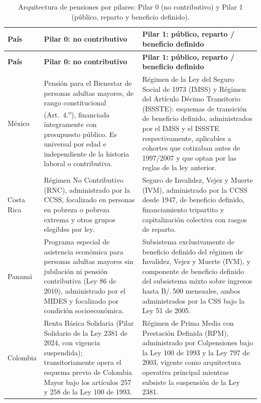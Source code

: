 \documentclass[12pt, letterpaper]{article}
\begin{document}
\begin{xltabular}{\textwidth}{P{2.1cm}Y Y}
\caption{Arquitectura de pensiones por pilares: Pilar 0 (no contributivo) y Pilar 1 (público, reparto y beneficio definido).}
\label{tab:pilares_01}\\
\toprule
\textbf{País} & \textbf{Pilar 0: no contributivo} & \textbf{Pilar 1: público, reparto / beneficio definido} \\
\midrule
\endfirsthead

\toprule
\textbf{País} & \textbf{Pilar 0: no contributivo} & \textbf{Pilar 1: público, reparto / beneficio definido} \\
\midrule
\endhead

\bottomrule
\endfoot

México &
Pensión para el Bienestar de personas adultas mayores, de rango constitucional (Art.\ 4.\textsuperscript{o}), financiada íntegramente con presupuesto público. Es universal por edad e independiente de la historia laboral o contributiva. &
Régimen de la Ley del Seguro Social de 1973 (IMSS) y Régimen del Artículo Décimo Transitorio (ISSSTE): esquemas de transición de beneficio definido, administrados por el IMSS y el ISSSTE respectivamente, aplicables a cohortes que cotizaban antes de 1997/2007 y que optan por las reglas de la ley anterior. \\

Costa Rica &
Régimen No Contributivo (RNC), administrado por la CCSS, focalizado en personas en pobreza o pobreza extrema y otros grupos elegibles por ley. &
Seguro de Invalidez, Vejez y Muerte (IVM), administrado por la CCSS desde 1947, de beneficio definido, financiamiento tripartito y capitalización colectiva con rasgos de reparto. \\

Panamá &
Programa especial de asistencia económica para personas adultas mayores sin jubilación ni pensión contributiva (Ley 86 de 2010), administrado por el MIDES y focalizado por condición socioeconómica. &
Subsistema exclusivamente de beneficio definido del régimen de Invalidez, Vejez y Muerte (IVM), y componente de beneficio definido del subsistema mixto sobre ingresos hasta B/.\,500 mensuales, ambos administrados por la CSS bajo la Ley 51 de 2005. \\

Colombia &
Renta Básica Solidaria (Pilar Solidario de la Ley 2381 de 2024, con vigencia suspendida); transitoriamente opera el esquema previo de Colombia Mayor bajo los artículos 257 y 258 de la Ley 100 de 1993. &
Régimen de Prima Media con Prestación Definida (RPM), administrado por Colpensiones bajo la Ley 100 de 1993 y la Ley 797 de 2003, vigente como arquitectura operativa principal mientras subsiste la suspensión de la Ley 2381. \\


\end{xltabular}
\end{document}
